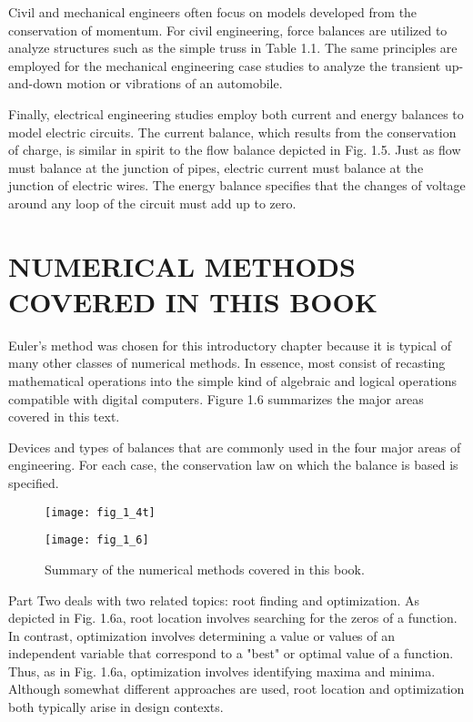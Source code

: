 \documentclass[../main.tex]{subfiles}
\begin{document}
Civil and mechanical engineers often focus on models developed from the conservation of momentum. For civil engineering, force balances are utilized to analyze structures
such as the simple truss in Table 1.1. The same principles are employed for the mechanical
engineering case studies to analyze the transient up-and-down motion or vibrations of an
automobile.

Finally, electrical engineering studies employ both current and energy balances to model
electric circuits. The current balance, which results from the conservation of charge, is similar in 
spirit to the flow balance depicted in Fig. 1.5. Just as flow must balance at the junction
of pipes, electric current must balance at the junction of electric wires. The energy balance
specifies that the changes of voltage around any loop of the circuit must add up to zero.



\section{NUMERICAL METHODS COVERED IN THIS BOOK}

Euler's method was chosen for this introductory chapter because it is typical of many other
classes of numerical methods. In essence, most consist of recasting mathematical operations 
into the simple kind of algebraic and logical operations compatible with digital computers.
 Figure 1.6 summarizes the major areas covered in this text. 
\begin{table}[H]
\caption{\textsf{Devices and types of balances that are commonly used in the four major areas of engineering. For
each case, the conservation law on which the balance is based is specified.}}
 \begin{figure}[H]
	\centering
	\texttt{[image: fig\_1\_4t]}
   
   \label{fig_1_4t}
\end{figure}
\end{table}


\begin{figure}[H]
	\centering
	\texttt{[image: fig\_1\_6]}
   \caption{\textsf{Summary of the numerical methods covered in this book.}}
   \label{fig_1_6}
\end{figure}


Part Two deals with two related topics: root finding and optimization. As depicted in
Fig. 1.6a, root location involves searching for the zeros of a function. In contrast, optimization involves determining 
a value or values of an independent variable that correspond to a
"best" or optimal value of a function. Thus, as in Fig. 1.6a, optimization involves identifying maxima and minima.
 Although somewhat different approaches are used, root location
and optimization both typically arise in design contexts.
\end{document}
